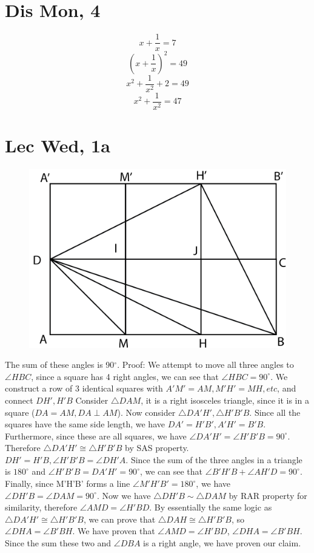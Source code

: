 \documentclass[12pt]{article}
\newcommand{\degrees}{^{\circ}}
\begin{document}
\section{Dis Mon, 4}
$$x+\frac{1}{x}=7$$
$$(x+\frac{1}{x})^2=49$$
$$x^2+\frac{1}{x^2}+2=49$$
$$x^2+\frac{1}{x^2}=47$$
\newpage

\section{Lec Wed, 1a}

\begin{figure}[h]
    \includegraphics{GRAPH1}
\end{figure}
The sum of these angles is 90$\degrees$.
\newline
Proof: We attempt to move all three angles to $\angle HBC$, since a square has 4 right angles, we can see that $\angle HBC = 90\degrees$.
\newline
We construct a row of 3 identical squares with $A'M' = AM, M'H' = MH, etc$, and connect $DH', H'B$
\newline
Consider $\triangle DAM$, it is a right isosceles triangle, since it is in a square ($DA = AM, DA \perp AM$). Now consider $\triangle DA'H', \triangle H'B'B$. Since all the squares have the same side length, we have $DA' = H'B', A'H'=B'B$. Furthermore, since these are all squares, we have $\angle DA'H' = \angle H'B'B = 90\degrees$.
\newline
Therefore $\triangle DA'H' \cong \triangle H'B'B$ by SAS property. $DH' = H'B, \angle H'B'B = \angle DH'A$. Since the sum of the three angles in a triangle is $180\degrees$ and $\angle H'B'B = DA'H' = 90\degrees$, we can see that $\angle B'H'B + \angle AH'D = 90\degrees$. Finally, since M'H'B' forms a line $\angle M'H'B' = 180 \degrees$, we have $\angle DH'B = \angle DAM = 90 \degrees$.
\newline
Now we have $\triangle DH'B \sim \triangle DAM$ by RAR property for similarity, therefore $\angle AMD = \angle H'BD$.
\newline
By essentially the same logic as $\triangle DA'H' \cong \triangle H'B'B$, we can prove that $\triangle DAH \cong \triangle H'B'B$, so $\angle DHA = \angle B'BH$.
\newline
We have proven that $\angle AMD = \angle H'BD$, $\angle DHA = \angle B'BH$. Since the sum these two and $\angle DBA$ is a right angle, we have proven our claim.
\newpage
\end{document}
